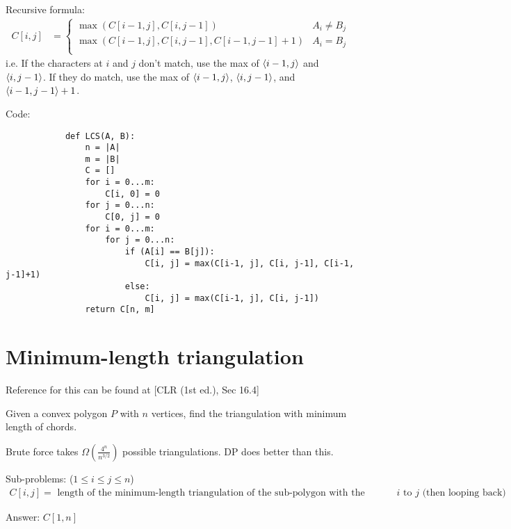         Recursive formula:
        \begin{align*}
            C[i, j] &=
            \left\{
                \begin{array}{lr}
                    \max(C[i-1, j], C[i, j-1]) & A_i \ne B_j \\
                    \max(C[i-1, j], C[i, j-1], C[i-1, j-1]+1) & A_i = B_j \\
                \end{array}
            \right.
        \end{align*}
        i.e. If the characters at $i$ and $j$ don't match, use the max of
        $\left \langle i-1, j \right \rangle $ and $\left \langle i, j-1 \right \rangle $.
        If they do match, use the max of $\left \langle i-1, j \right \rangle $, $\left \langle i, j-1 \right \rangle $, and
        $\left \langle i-1, j-1 \right \rangle +1$.

        Code:
        \begin{verbatim}
            def LCS(A, B):
                n = |A|
                m = |B|
                C = []
                for i = 0...m:
                    C[i, 0] = 0
                for j = 0...n:
                    C[0, j] = 0
                for i = 0...m:
                    for j = 0...n:
                        if (A[i] == B[j]):
                            C[i, j] = max(C[i-1, j], C[i, j-1], C[i-1, j-1]+1)
                        else:
                            C[i, j] = max(C[i-1, j], C[i, j-1])
                return C[n, m]
        \end{verbatim}

    \section{Minimum-length triangulation}
        Reference for this can be found at [CLR (1st ed.), Sec 16.4]

        Given a convex polygon $P$ with $n$ vertices, find the triangulation
        with minimum length of chords.

        Brute force takes $\Omega\left(\frac{4^n}{n^{3/2}}\right)$ possible
        triangulations. DP does better than this.

        Sub-problems: ($1 \le i \le j \le n$)
        \begin{align*}
            C[i, j] = \text{ length of the minimum-length triangulation of
                the sub-polygon with the vertices running from $i$ to $j$ (then looping back) }
        \end{align*}

        Answer: $C[1, n]$

